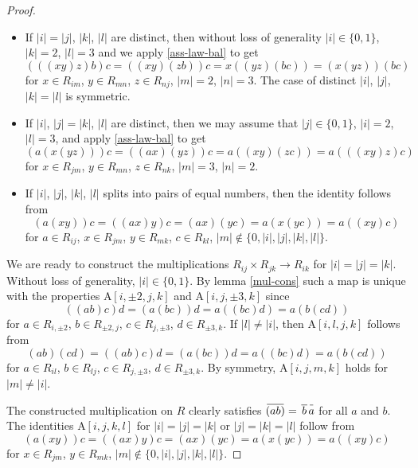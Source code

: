 \documentclass{article}
\theoremstyle{definition}
\newcommand{\inv}[1]{
    \!\;\overline{
        \!\!\:#1\vphantom !\!\!\:
    }\;\!
}
\begin{document}
\begin{proof}
\begin{itemize}
        \item If \(|i| = |j|\), \(|k|\), \(|l|\) are distinct, then without loss of generality \(|i| \in \{0, 1\}\), \(|k| = 2\), \(|l| = 3\) and we apply \ref{ass-law-bal} to get \[
            (((xy)z)b)c
            =
            ((xy)(zb))c
            =
            x((yz)(bc))
            =
            (x(yz))(bc)
        \] for \(x \in R_{im}\), \(y \in R_{mn}\), \(z \in R_{nj}\), \(|m| = 2\), \(|n| = 3\). The case of distinct \(|i|\), \(|j|\), \(|k| = |l|\) is symmetric.

        \item If \(|i|\), \(|j| = |k|\), \(|l|\) are distinct, then we may assume that \(|j| \in \{0, 1\}\), \(|i| = 2\), \(|l| = 3\), and apply \ref{ass-law-bal} to get \[
            (a(x(yz)))c
            =
            ((ax)(yz))c
            =
            a((xy)(zc))
            =
            a(((xy)z)c)
        \] for \(x \in R_{jm}\), \(y \in R_{mn}\), \(z \in R_{nk}\), \(|m| = 3\), \(|n| = 2\).

        \item If \(|i|\), \(|j|\), \(|k|\), \(|l|\) splits into pairs of equal numbers, then the identity follows from \[
            (a(xy))c
            =
            ((ax)y)c
            =
            (ax)(yc)
            =
            a(x(yc))
            =
            a((xy)c)
        \] for \(a \in R_{ij}\), \(x \in R_{jm}\), \(y \in R_{mk}\), \(c \in R_{kl}\), \(|m| \notin \{0, |i|, |j|, |k|, |l|\}\).

    \end{itemize}

    We are ready to construct the multiplications \(
        R_{ij} \times R_{jk} \to R_{ik}
    \) for \(|i| = |j| = |k|\). Without loss of generality, \(|i| \in \{0, 1\}\). By lemma \ref{mul-cons} such a map is unique with the properties \(
        \mathrm A[i, \pm 2, j, k]
    \) and \(
        \mathrm A[i, j, \pm 3, k]
    \) since \[
        ((ab)c)d
        =
        (a(bc))d
        =
        a((bc)d)
        =
        a(b(cd))
    \] for \(a \in R_{i, \pm 2}\), \(b \in R_{\pm 2, j}\), \(c \in R_{j, \pm 3}\), \(d \in R_{\pm 3, k}\). If \(|l| \neq |i|\), then \(\mathrm A[i, l, j, k]\) follows from \[
        (ab)(cd)
        =
        ((ab)c)d
        =
        (a(bc))d
        =
        a((bc)d)
        =
        a(b(cd))
    \] for \(a \in R_{il}\), \(b \in R_{lj}\), \(c \in R_{j, \pm 3}\), \(d \in R_{\pm 3, k}\). By symmetry, \(\mathrm A[i, j, m, k]\) holds for \(|m| \neq |i|\).

    The constructed multiplication on \(R\) clearly satisfies \(
        \inv{(ab)} = \inv{\,b\,} \inv a
    \) for all \(a\) and \(b\). The identities \(
        \mathrm A[i, j, k, l]
    \) for \(
        |i| = |j| = |k|
    \) or \(
        |j| = |k| = |l|
    \) follow from \[
        (a(xy))c
        =
        ((ax)y)c
        =
        (ax)(yc)
        =
        a(x(yc))
        =
        a((xy)c)
    \] for \(x \in R_{jm}\), \(y \in R_{mk}\), \(
        |m| \notin \{0, |i|, |j|, |k|, |l|\}
    \).


\end{proof}
\end{document}

